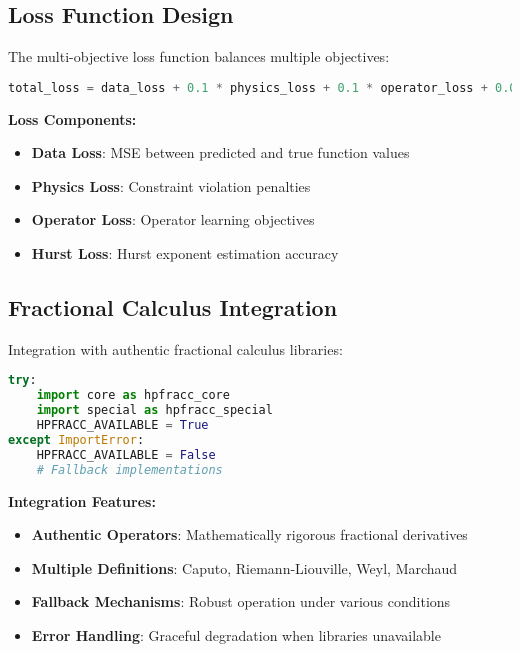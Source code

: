\documentclass[11pt,a4paper]{article}
\begin{document}
\subsection{Loss Function Design}

The multi-objective loss function balances multiple objectives:

\begin{lstlisting}[language=Python, caption=Multi-Objective Loss Function]
total_loss = data_loss + 0.1 * physics_loss + 0.1 * operator_loss + 0.05 * hurst_loss
\end{lstlisting}

\textbf{Loss Components:}
\begin{itemize}
    \item \textbf{Data Loss}: MSE between predicted and true function values
    \item \textbf{Physics Loss}: Constraint violation penalties
    \item \textbf{Operator Loss}: Operator learning objectives
    \item \textbf{Hurst Loss}: Hurst exponent estimation accuracy
\end{itemize}

\subsection{Fractional Calculus Integration}

Integration with authentic fractional calculus libraries:

\begin{lstlisting}[language=Python, caption=Fractional Operator Integration]
try:
    import core as hpfracc_core
    import special as hpfracc_special
    HPFRACC_AVAILABLE = True
except ImportError:
    HPFRACC_AVAILABLE = False
    # Fallback implementations
\end{lstlisting}

\textbf{Integration Features:}
\begin{itemize}
    \item \textbf{Authentic Operators}: Mathematically rigorous fractional derivatives
    \item \textbf{Multiple Definitions}: Caputo, Riemann-Liouville, Weyl, Marchaud
    \item \textbf{Fallback Mechanisms}: Robust operation under various conditions
    \item \textbf{Error Handling}: Graceful degradation when libraries unavailable
\end{itemize}
\end{document}
